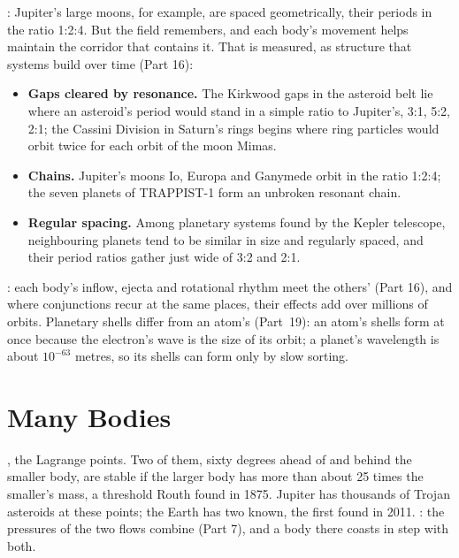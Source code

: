 \documentclass[11pt,a4paper]{article}
\begin{document}
: Jupiter's large moons, for example, are spaced geometrically, their periods in the ratio 1:2:4. But the field remembers, and each body's movement helps maintain the corridor that contains it. That is measured, as structure that systems build over time (Part 16):
\begin{itemize}
\item \textbf{Gaps cleared by resonance.} The Kirkwood gaps in the asteroid belt lie where an asteroid's period would stand in a simple ratio to Jupiter's, 3:1, 5:2, 2:1; the Cassini Division in Saturn's rings begins where ring particles would orbit twice for each orbit of the moon Mimas.
\item \textbf{Chains.} Jupiter's moons Io, Europa and Ganymede orbit in the ratio 1:2:4; the seven planets of TRAPPIST-1 form an unbroken resonant chain.
\item \textbf{Regular spacing.} Among planetary systems found by the Kepler telescope, neighbouring planets tend to be similar in size and regularly spaced, and their period ratios gather just wide of 3:2 and 2:1.
\end{itemize}
: each body's inflow, ejecta and rotational rhythm meet the others' (Part 16), and where conjunctions recur at the same places, their effects add over millions of orbits. Planetary shells differ from an atom's (Part~19): an atom's shells form at once because the electron's wave is the size of its orbit; a planet's wavelength is about $10^{-63}$ metres, so its shells can form only by slow sorting.

\section{Many Bodies}
\label{sec:many}

, the Lagrange points. Two of them, sixty degrees ahead of and behind the smaller body, are stable if the larger body has more than about 25 times the smaller's mass, a threshold Routh found in 1875. Jupiter has thousands of Trojan asteroids at these points; the Earth has two known, the first found in 2011. : the pressures of the two flows combine (Part 7), and a body there coasts in step with both.
\end{document}
